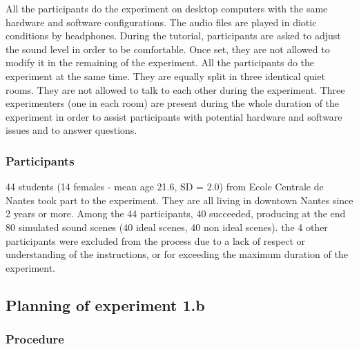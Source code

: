 \documentclass[preprint,12pt]{elsarticle}
\begin{document}
All the participants do the experiment on desktop computers with the same hardware and software configurations. The audio files are played in diotic conditions by headphones. During the tutorial, participants are asked to adjust the sound level in order to be comfortable. Once set, they are not allowed to modify it in the remaining of the experiment.
All the participants do the experiment at the same time. They are equally split in three identical quiet rooms. They are not allowed to talk to each other during the experiment.
Three experimenters (one in each room) are present during the whole duration of the experiment in order to assist participants with potential hardware and software issues and to answer questions.

\subsubsection*{Participants}

%

44 students (14 females - mean age 21.6, SD = 2.0) from Ecole Centrale de Nantes took part to the experiment. They are all living in downtown Nantes since 2 years or more.
Among the 44 participants, 40 succeeded, producing at the end 80 simulated sound scenes (40 ideal scenes, 40 non ideal scenes). the 4 other participants were excluded from the process due to a lack of respect or understanding of the instructions, or for exceeding the maximum duration of the experiment.

\subsection{Planning of experiment 1.b}
\label{sec:xp1b_plan}

\subsubsection*{Procedure}
\end{document}
